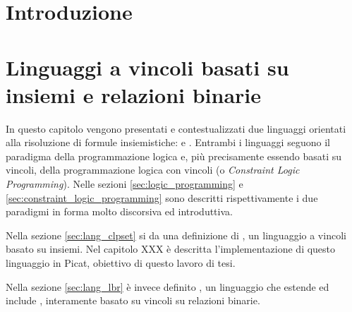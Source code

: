 \documentclass[12pt,a4paper,openright]{book} %
\begin{document}

\tableofcontents



\chapter*{Introduzione}

\lipsum[1-4]


%
%


\chapter{Linguaggi a vincoli basati su insiemi e relazioni binarie}
\label{ch:sets-binrel-based-constraint-languages}

\minitoc

In questo capitolo vengono presentati e contestualizzati due linguaggi orientati alla risoluzione di formule insiemistiche: \clpset{} e \lbr{}. Entrambi i linguaggi seguono il paradigma della programmazione logica e, più precisamente essendo basati su vincoli, della programmazione logica con vincoli (o \textit{Constraint Logic Programming}). Nelle sezioni \ref{sec:logic_programming} e \ref{sec:constraint_logic_programming} sono descritti rispettivamente i due paradigmi in forma molto discorsiva ed introduttiva.

Nella sezione \ref{sec:lang_clpset} si da una definizione di \clpset{}, un linguaggio a vincoli basato su insiemi. 
Nel capitolo XXX è descritta l'implementazione di questo linguaggio in Picat, obiettivo di questo lavoro di tesi.

Nella sezione \ref{sec:lang_lbr} è invece definito \lbr{}, un linguaggio che estende ed include \clpset{}, interamente basato su vincoli su relazioni binarie.
\end{document}
